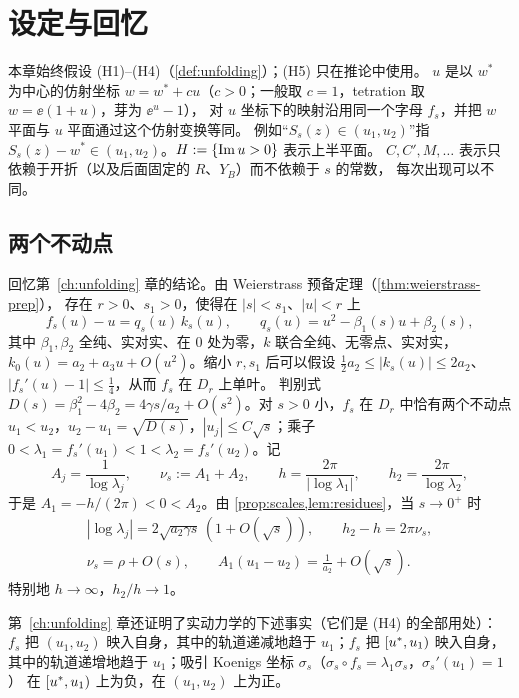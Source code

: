 \section{设定与回忆}\label{ch7:sec:setup}

本章始终假设 (H1)--(H4)（\cref{def:unfolding}）；(H5) 只在推论中使用。
$u$ 是以 $w^*$ 为中心的仿射坐标 $w=w^*+cu$（$c>0$；一般取 $c=1$，tetration 取 $w=\ee(1+u)$，芽为 $\ee^u-1$），
对 $u$ 坐标下的映射沿用同一个字母 $f_s$，并把 $w$ 平面与 $u$ 平面通过这个仿射变换等同。
例如``$S_s(z)\in(u_1,u_2)$''指 $S_s(z)-w^*\in(u_1,u_2)$。$H:=\{\operatorname{Im} u>0\}$ 表示上半平面。
$C,C',M,\dots$ 表示只依赖于开折（以及后面固定的 $R$、$Y_B$）而不依赖于 $s$ 的常数，
每次出现可以不同。

\subsection{两个不动点}
回忆第~\ref{ch:unfolding} 章的结论。由 Weierstrass 预备定理（\cref{thm:weierstrass-prep}），
存在 $r>0$、$s_1>0$，使得在 $|s|<s_1$、$|u|<r$ 上
\begin{equation}\label{ch7:eq:prep}
 f_s(u)-u=q_s(u)\,k_s(u),\qquad q_s(u)=u^2-\beta_1(s)u+\beta_2(s),
\end{equation}
其中 $\beta_1,\beta_2$ 全纯、实对实、在 $0$ 处为零，$k$ 联合全纯、无零点、实对实，
$k_0(u)=a_2+a_3u+O(u^2)$。缩小 $r,s_1$ 后可以假设
$\tfrac12a_2\le|k_s(u)|\le2a_2$、$|f_s'(u)-1|\le\frac14$，从而 $f_s$ 在 $D_r$ 上单叶。
判别式 $D(s)=\beta_1^2-4\beta_2=4\gamma s/a_2+O(s^2)$。对 $s>0$ 小，$f_s$ 在 $D_r$ 中恰有两个不动点
$u_1<u_2$，$u_2-u_1=\sqrt{D(s)}$，$|u_j|\le C\sqrt s$；乘子
$0<\lambda_1=f_s'(u_1)<1<\lambda_2=f_s'(u_2)$。记
\[
 A_j=\frac1{\log\lambda_j},\qquad \nu_s:=A_1+A_2,\qquad h=\frac{2\pi}{|\log\lambda_1|},\qquad h_2=\frac{2\pi}{\log\lambda_2},
\]
于是 $A_1=-h/(2\pi)<0<A_2$。由 \cref{prop:scales,lem:residues}，当 $s\to0^+$ 时
\begin{equation}\label{ch7:eq:scales}
\begin{gathered}
 |\log\lambda_j|=2\sqrt{a_2\gamma s}\,(1+O(\sqrt s)),\qquad h_2-h=2\pi\nu_s,\\
 \nu_s=\rho+O(s),\qquad A_1(u_1-u_2)=\frac1{a_2}+O(\sqrt s).
\end{gathered}
\end{equation}
特别地 $h\to\infty$，$h_2/h\to1$。

第~\ref{ch:unfolding} 章还证明了实动力学的下述事实（它们是 (H4) 的全部用处）：
$f_s$ 把 $(u_1,u_2)$ 映入自身，其中的轨道递减地趋于 $u_1$；$f_s$ 把 $[u^{*},u_1)$ 映入自身，
其中的轨道递增地趋于 $u_1$；吸引 Koenigs 坐标 $\sigma_s$（$\sigma_s\circ f_s=\lambda_1\sigma_s$，$\sigma_s'(u_1)=1$）
在 $[u^{*},u_1)$ 上为负，在 $(u_1,u_2)$ 上为正。

